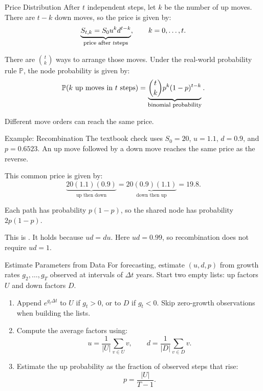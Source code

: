 \documentclass[aspectratio=169,11pt]{beamer}
\newcommand{\Pmeasure}{\mathbb{P}}
\begin{document}
\begin{frame}{Price Distribution}
  After $t$ independent steps, let $k$ be the number of up moves.
  There are $t-k$ down moves, so the price is given by:
  \[
    \underbrace{S_{t,k}=S_0u^kd^{t-k}}_{\text{\footnotesize price after }t\text{\footnotesize steps}},
    \qquad k=0,\ldots,t.
  \]

  There are $\binom tk$ ways to arrange those moves.
  Under the real-world probability rule $\Pmeasure$, the node probability is given by:
  \[
    \Pmeasure(k\text{ up moves in }t\text{ steps})
    =\underbrace{\binom tk p^k(1-p)^{t-k}}_{\text{\footnotesize binomial probability}}.
  \]

  Different move orders can reach the same price.
\end{frame}



\begin{frame}{Example: Recombination}
  The textbook check uses $S_0=20$, $u=1.1$, $d=0.9$, and $p=0.6523$.
  An up move followed by a down move reaches the same price as the reverse.

  This common price is given by:
  \[
    \underbrace{20(1.1)(0.9)}_{\text{up then down}}
    =\underbrace{20(0.9)(1.1)}_{\text{down then up}}
    =19.8.
  \]

  Each path has probability $p(1-p)$, so the shared node has probability
  $2p(1-p)$.

  \vspace{0.7em}
  This is . It holds because $ud=du$.
  Here $ud=0.99$, so recombination does not require $ud=1$.

\end{frame}

\begin{frame}{Estimate Parameters from Data}
  For forecasting, estimate $(u,d,p)$ from growth rates $g_2,\ldots,g_T$
  observed at intervals of $\Delta t$ years. Start two empty lists:
  up factors $U$ and down factors $D$.

  \vspace{0.5em}
  \begin{enumerate}\setlength{\itemsep}{0.55em}
    \item Append $e^{g_t\Delta t}$ to $U$ if $g_t>0$, or to $D$ if $g_t<0$.
      Skip zero-growth observations when building the lists.
    \item Compute the average factors using:
      \[
        u=\frac{1}{|U|}\sum_{v\in U}v,
        \qquad
        d=\frac{1}{|D|}\sum_{v\in D}v.
      \]
    \item Estimate the up probability as the fraction of observed steps that rise:
      \[
        p=\frac{|U|}{T-1}.
      \]
  \end{enumerate}

\end{frame}
\end{document}
